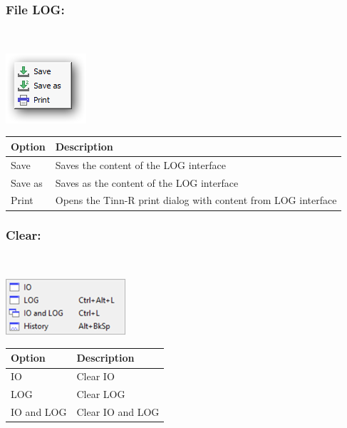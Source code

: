 \hypertarget{menu_r_term_file_Log}{}
\subsubsection{File LOG:}\\

\includegraphics[scale=0.8]{./res/menu_r_term_file_IOandLog.png}\\

\begin{scriptsize}
  \begin{tabularx}{\textwidth}{>{\hsize=0.3\hsize}X>{\hsize=0.7\hsize}X}\\
    \hline
    \textbf{Option} & \textbf{Description} \\
    \hline
    Save & Saves the content of the LOG interface \\
    Save as & Saves as the content of the LOG interface \\
    Print & Opens the Tinn-R print dialog with content from LOG interface \\
    \hline
  \end{tabularx}
\end{scriptsize}

\hypertarget{menu_r_term_clear}{}
\subsubsection{Clear:}\\

\includegraphics[scale=0.8]{./res/menu_r_term_clear.png}\\

\begin{scriptsize}
  \begin{tabularx}{\textwidth}{>{\hsize=0.3\hsize}X>{\hsize=0.7\hsize}X}\\
    \hline
    \textbf{Option} & \textbf{Description} \\
    \hline
    IO & Clear IO \\
    LOG & Clear LOG \\
    IO and LOG & Clear IO and LOG \\
    \hline
  \end{tabularx}
\end{scriptsize}

